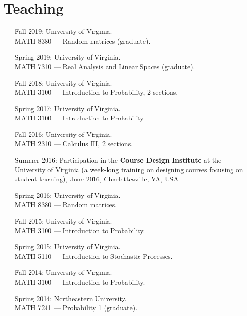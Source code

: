 \documentclass[letterpaper,11pt]{article}
\begin{document}
\section*{Teaching}

\begin{itemize}
	\item 
				[Fall 2019:]
				University of Virginia. \\ MATH 8380 --- Random matrices (graduate).
	\item 
				[Spring 2019:]
				University of Virginia. \\ MATH 7310 --- Real Analysis and Linear Spaces (graduate).
	\item
	      [Fall 2018:]
	      University of Virginia. \\ MATH 3100 --- Introduction to
				Probability, 2 sections.
	\item
	      [Spring 2017:]
	      University of Virginia. \\ MATH 3100 --- Introduction to
	      Probability.

	\item
	      [Fall 2016:]
	      University of Virginia. \\ MATH 2310 --- Calculus III, 2
	      sections.

	\item
	      [Summer 2016:] Participation in the \textbf{Course Design
		      Institute} at
	      the University of Virginia (a week-long training on designing
	      courses focusing on student learning), June 2016, Charlottesville, VA, USA.

	\item
	      [Spring 2016:]
	      University of Virginia. \\ MATH 8380 --- Random matrices.

	\item
	      [Fall 2015:]
	      University of Virginia. \\ MATH 3100 --- Introduction to
	      Probability.

	\item
	      [Spring 2015:]
	      University of Virginia. \\ MATH 5110 --- Introduction to
	      Stochastic Processes.

	\item
	      [Fall 2014:]
	      University of Virginia. \\ MATH 3100 --- Introduction to
	      Probability.

	\item
	      [Spring 2014:]
	      Northeastern University. \\ MATH 7241 --- Probability 1
	      (graduate).


\end{itemize}
\end{document}
